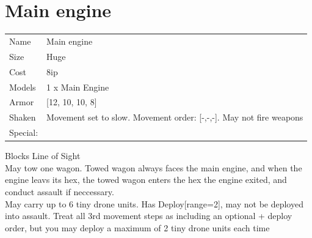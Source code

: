 \ \\
 
\ \\













\clearpage

\section{ Main engine }

\begin{tabular}{ll}
  Name & Main engine \\
  Size & Huge\\
  Cost & 8ip\\
  Models & 1 x Main Engine\\
  Armor & [12, 10, 10, 8]\\
  Shaken & Movement set to slow. Movement order: [-,-,-]. May not fire weapons\\
  Special: \\
\end{tabular}

\noindent Blocks Line of Sight\\ 
May tow one wagon. Towed wagon always faces the main engine, and when the engine leavs its hex, the towed wagon enters the hex the engine exited, and conduct assault if neccessary.\\ 
May carry up to 6 tiny drone units. Has Deploy[range=2], may not be deployed into assault. Treat all 3rd movement steps as including an optional + deploy order, but you may deploy a maximum of 2 tiny drone units each time\\ 


